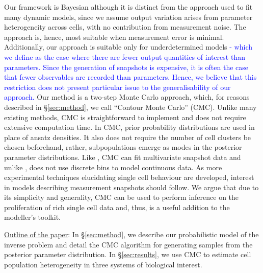 Our framework is Bayesian although it is distinct from the approach used to fit many dynamic models, since we assume output variation arises from parameter heterogeneity across cells, with no contribution from measurement noise. The approach is, hence, most suitable when measurement error is minimal. Additionally, our approach is suitable only for underdetermined models \textcolor{blue}{- which we define as the case where there are fewer output quantities of interest than parameters. Since the generation of snapshots is expensive, it is often the case that fewer observables are recorded than parameters. Hence, we believe that this restriction does not present particular issue to the generalisability of our approach.} Our method is a two-step Monte Carlo approach, which, for reasons described in \S \ref{sec:method}, we call ``Contour Monte Carlo'' (CMC). Unlike many existing methods, CMC is straightforward to implement and does not require extensive computation time. In CMC, prior probability distributions are used in place of ansatz densities. It also does not require the number of cell clusters be chosen beforehand, rather, subpopulations emerge as modes in the posterior parameter distributions. Like \cite{loos2018hierarchical}, CMC can fit multivariate snapshot data and unlike \cite{dixit2018maximum}, does not use discrete bins to model continuous data. As more experimental techniques elucidating single cell behaviour are developed, interest in models describing measurement snapshots should follow. We argue that due to its simplicity and generality, CMC can be used to perform inference on the proliferation of rich single cell data and, thus, is a useful addition to the modeller's toolkit.


\underline{Outline of the paper}: In \S \ref{sec:method}, we describe our probabilistic model of the inverse problem and detail the CMC algorithm for generating samples from the posterior parameter distribution. In \S \ref{sec:results}, we use CMC to estimate cell population heterogeneity in three systems of biological interest.



